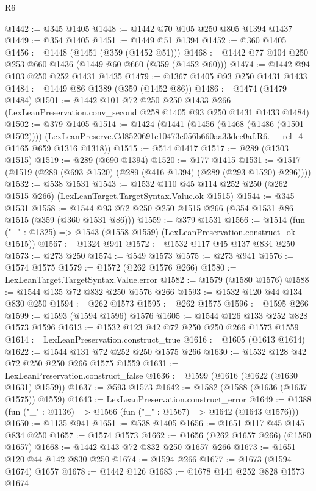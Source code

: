 \begin{lexlean}{R6}
\begin{coremodule}
@1442 := @345 @1405
@1448 := @1442 @70 @105 @250 @805 @1394 @1437
@1449 := @354 @1405
@1451 := @1449 @51 @1394
@1452 := @360 @1405
@1456 := @1448 (@1451 (@359 (@1452 @51)))
@1468 := @1442 @77 @104 @250 @253 @660 @1436 (@1449 @60 @660 (@359 (@1452 @60)))
@1474 := @1442 @94 @103 @250 @252 @1431 @1435
@1479 := @1367 @1405 @93 @250 @1431 @1433
@1484 := @1449 @86 @1389 (@359 (@1452 @86))
@1486 := @1474 (@1479 @1484)
@1501 := @1442
    @101
    @72
    @250
    @250
    @1433
    @266
    (LexLeanPreservation.conv_second @258 @1405 @93 @250 @1431 @1433 @1484)
@1502 := @379 @1405
@1514 := @1424
    (@1441
      (@1456 (@1468 (@1486 (@1501 @1502))))
      (LexLeanPreserve.Cd8520691c10473c056b660aa33dec0af.R6.__rel_4 @1165 @659 @1316 @1318))
@1515 := @514 @1417
@1517 := @289 (@1303 @1515)
@1519 := @289 (@690 @1394)
@1520 := @177 @1415
@1531 := @1517 (@1519 (@289 (@693 @1520) (@289 (@416 @1394) (@289 (@293 @1520) @296))))
@1532 := @538 @1531
@1543 := @1532 @110 @45 @114 @252 @250 (@262 @1515 @266) (LexLeanTarget.TargetSyntax.Value.ok @1515)
@1544 := @345 @1531
@1558 := @1544 @93 @72 @250 @250 @1515 @266 (@354 @1531 @86 @1515 (@359 (@360 @1531 @86)))
@1559 := @379 @1531
@1566 := @1514 (fun ("_" : @1325) => @1543 (@1558 @1559) (LexLeanPreservation.construct_ok @1515))
@1567 := @1324 @941
@1572 := @1532 @117 @45 @137 @834 @250
@1573 := @273 @250
@1574 := @549 @1573
@1575 := @273 @941
@1576 := @1574 @1575
@1579 := @1572 (@262 @1576 @266)
@1580 := LexLeanTarget.TargetSyntax.Value.error
@1582 := @1579 (@1580 @1576)
@1588 := @1544 @135 @72 @832 @250 @1576 @266
@1593 := @1532 @120 @44 @134 @830 @250
@1594 := @262 @1573
@1595 := @262 @1575
@1596 := @1595 @266
@1599 := @1593 (@1594 @1596) @1576
@1605 := @1544 @126 @133 @252 @828 @1573 @1596
@1613 := @1532 @123 @42 @72 @250 @250 @266 @1573 @1559
@1614 := LexLeanPreservation.construct_true
@1616 := @1605 (@1613 @1614)
@1622 := @1544 @131 @72 @252 @250 @1575 @266
@1630 := @1532 @128 @42 @72 @250 @250 @266 @1575 @1559
@1631 := LexLeanPreservation.construct_false
@1636 := @1599 (@1616 (@1622 (@1630 @1631) @1559))
@1637 := @593 @1573
@1642 := @1582 (@1588 (@1636 (@1637 @1575)) @1559)
@1643 := LexLeanPreservation.construct_error
@1649 := @1388 (fun ("_" : @1136) => @1566 (fun ("_" : @1567) => @1642 (@1643 @1576)))
@1650 := @1135 @941
@1651 := @538 @1405
@1656 := @1651 @117 @45 @145 @834 @250
@1657 := @1574 @1573
@1662 := @1656 (@262 @1657 @266) (@1580 @1657)
@1668 := @1442 @143 @72 @832 @250 @1657 @266
@1673 := @1651 @120 @44 @142 @830 @250
@1674 := @1594 @266
@1677 := @1673 (@1594 @1674) @1657
@1678 := @1442 @126
@1683 := @1678 @141 @252 @828 @1573 @1674

\end{coremodule}
\end{lexlean}
